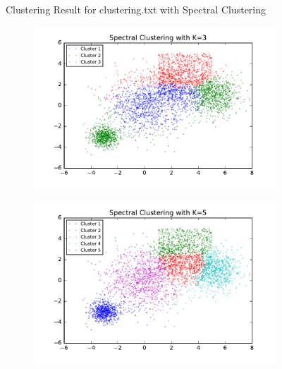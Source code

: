 \begin{description}
\begin{description}
\begin{figure}[!h]
\begin{subfigure}[b]{0.475\textwidth}
        \end{subfigure}        
        \caption{Clustering Result for clustering.txt with Spectral Clustering}
        \label{fig:spectral_clustering}
\end{figure}

\begin{figure}[!h]
        \centering
        \begin{subfigure}[b]{0.475\textwidth}
            \centering
            \includegraphics[width=\textwidth]{./figures/bigClustering_spectral_3.pdf}
        \end{subfigure}
        \hfill  
        \begin{subfigure}[b]{0.475\textwidth}  
            \centering 
            \includegraphics[width=\textwidth]{./figures/bigClustering_spectral_5.pdf}
        \end{subfigure}  

\end{figure}
\end{description}
\end{description}
